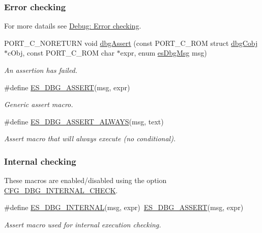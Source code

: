 \subsubsection*{Error checking}
\label{_amgrpc3e04bd7ea7a3958c683753317428f1a}%
For more datails see \hyperlink{errors}{Debug\-: Error checking}. \begin{DoxyCompactItemize}
\item 
P\-O\-R\-T\-\_\-\-C\-\_\-\-N\-O\-R\-E\-T\-U\-R\-N void \hyperlink{group__dbg__intf_ga204facb7daeaa5ae665adf96eed0df8d}{dbg\-Assert} (const P\-O\-R\-T\-\_\-\-C\-\_\-\-R\-O\-M struct \hyperlink{structdbgCobj}{dbg\-Cobj} $\ast$c\-Obj, const P\-O\-R\-T\-\_\-\-C\-\_\-\-R\-O\-M char $\ast$expr, enum \hyperlink{group__dbg__intf_ga571a5933b00f4fdc98d1885a6b0f4613}{es\-Dbg\-Msg} msg)
\begin{DoxyCompactList}\small\item\em An assertion has failed. \end{DoxyCompactList}\item 
\#define \hyperlink{group__dbg__intf_ga3826c957cc3aed7873397c0dac0b7030}{E\-S\-\_\-\-D\-B\-G\-\_\-\-A\-S\-S\-E\-R\-T}(msg, expr)
\begin{DoxyCompactList}\small\item\em Generic assert macro. \end{DoxyCompactList}\item 
\#define \hyperlink{group__dbg__intf_gacb07b54b924ab75eff1612d03091d48c}{E\-S\-\_\-\-D\-B\-G\-\_\-\-A\-S\-S\-E\-R\-T\-\_\-\-A\-L\-W\-A\-Y\-S}(msg, text)
\begin{DoxyCompactList}\small\item\em Assert macro that will always execute (no conditional). \end{DoxyCompactList}\end{DoxyCompactItemize}
\subsubsection*{Internal checking}
\label{_amgrpe256dab415cdaed7980076817a665348}%
These macros are enabled/disabled using the option \hyperlink{group__dbg__cfg_ga530daa344716eca7cf87075dd7a8fca1}{C\-F\-G\-\_\-\-D\-B\-G\-\_\-\-I\-N\-T\-E\-R\-N\-A\-L\-\_\-\-C\-H\-E\-C\-K}. \begin{DoxyCompactItemize}
\item 
\#define \hyperlink{group__dbg__intf_ga0cc690757e946a0fcd95b1ec7d430a3c}{E\-S\-\_\-\-D\-B\-G\-\_\-\-I\-N\-T\-E\-R\-N\-A\-L}(msg, expr)~\hyperlink{group__dbg__intf_ga3826c957cc3aed7873397c0dac0b7030}{E\-S\-\_\-\-D\-B\-G\-\_\-\-A\-S\-S\-E\-R\-T}(msg, expr)
\begin{DoxyCompactList}\small\item\em Assert macro used for internal execution checking. \end{DoxyCompactList}\end{DoxyCompactItemize}
